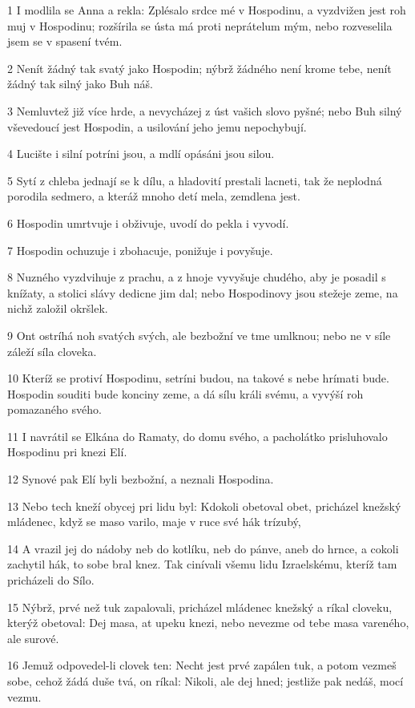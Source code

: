 \par 1 I modlila se Anna a rekla: Zplésalo srdce mé v Hospodinu, a vyzdvižen jest roh muj v Hospodinu; rozšírila se ústa má proti neprátelum mým, nebo rozveselila jsem se v spasení tvém.
\par 2 Nenít žádný tak svatý jako Hospodin; nýbrž žádného není krome tebe, nenít žádný tak silný jako Buh náš.
\par 3 Nemluvtež již více hrde, a nevycházej z úst vašich slovo pyšné; nebo Buh silný vševedoucí jest Hospodin, a usilování jeho jemu nepochybují.
\par 4 Lucište i silní potríni jsou, a mdlí opásáni jsou silou.
\par 5 Sytí z chleba jednají se k dílu, a hladovití prestali lacneti, tak že neplodná porodila sedmero, a kteráž mnoho detí mela, zemdlena jest.
\par 6 Hospodin umrtvuje i obživuje, uvodí do pekla i vyvodí.
\par 7 Hospodin ochuzuje i zbohacuje, ponižuje i povyšuje.
\par 8 Nuzného vyzdvihuje z prachu, a z hnoje vyvyšuje chudého, aby je posadil s knížaty, a stolici slávy dedicne jim dal; nebo Hospodinovy jsou stežeje zeme, na nichž založil okršlek.
\par 9 Ont ostríhá noh svatých svých, ale bezbožní ve tme umlknou; nebo ne v síle záleží síla cloveka.
\par 10 Kteríž se protiví Hospodinu, setríni budou, na takové s nebe hrímati bude. Hospodin souditi bude konciny zeme, a dá sílu králi svému, a vyvýší roh pomazaného svého.
\par 11 I navrátil se Elkána do Ramaty, do domu svého, a pacholátko prisluhovalo Hospodinu pri knezi Elí.
\par 12 Synové pak Elí byli bezbožní, a neznali Hospodina.
\par 13 Nebo tech kneží obycej pri lidu byl: Kdokoli obetoval obet, pricházel knežský mládenec, když se maso varilo, maje v ruce své hák trízubý,
\par 14 A vrazil jej do nádoby neb do kotlíku, neb do pánve, aneb do hrnce, a cokoli zachytil hák, to sobe bral knez. Tak cinívali všemu lidu Izraelskému, kteríž tam pricházeli do Sílo.
\par 15 Nýbrž, prvé než tuk zapalovali, pricházel mládenec knežský a ríkal cloveku, kterýž obetoval: Dej masa, at upeku knezi, nebo nevezme od tebe masa vareného, ale surové.
\par 16 Jemuž odpovedel-li clovek ten: Necht jest prvé zapálen tuk, a potom vezmeš sobe, cehož žádá duše tvá, on ríkal: Nikoli, ale dej hned; jestliže pak nedáš, mocí vezmu.

